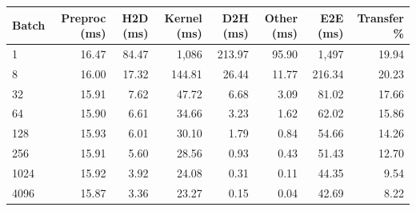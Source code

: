 \begin{tabular}{lrrrrrrr}
\toprule
Batch & Preproc (ms) & H2D (ms) & Kernel (ms) & D2H (ms) & Other (ms) & E2E (ms) & Transfer \% \\
\midrule
1 & 16.47 & 84.47 & 1,086 & 213.97 & 95.90 & 1,497 & 19.94 \\
8 & 16.00 & 17.32 & 144.81 & 26.44 & 11.77 & 216.34 & 20.23 \\
32 & 15.91 & 7.62 & 47.72 & 6.68 & 3.09 & 81.02 & 17.66 \\
64 & 15.90 & 6.61 & 34.66 & 3.23 & 1.62 & 62.02 & 15.86 \\
128 & 15.93 & 6.01 & 30.10 & 1.79 & 0.84 & 54.66 & 14.26 \\
256 & 15.91 & 5.60 & 28.56 & 0.93 & 0.43 & 51.43 & 12.70 \\
1024 & 15.92 & 3.92 & 24.08 & 0.31 & 0.11 & 44.35 & 9.54 \\
4096 & 15.87 & 3.36 & 23.27 & 0.15 & 0.04 & 42.69 & 8.22 \\
\bottomrule
\end{tabular}
